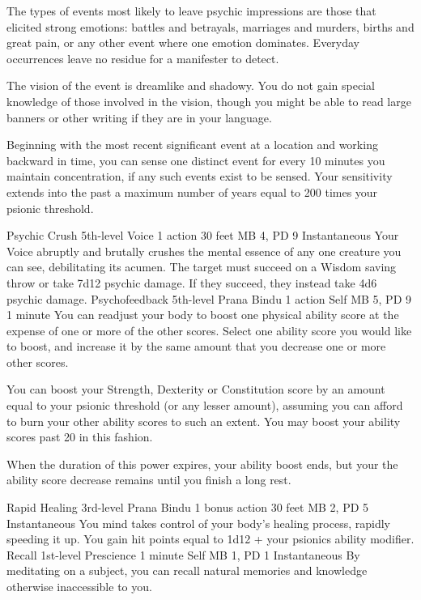 The types of events most likely to leave psychic impressions
are those that elicited strong emotions: battles and betrayals,
marriages and murders, births and great pain, or any other
event where one emotion dominates. Everyday occurrences leave
no residue for a manifester to detect.

The vision of the event is dreamlike and shadowy. You do not
gain special knowledge of those involved in the vision, though
you might be able to read large banners or other writing if
they are in your language.

Beginning with the most recent significant event at a location
and working backward in time, you can sense one distinct event
for every 10 minutes you maintain concentration, if any such
events exist to be sensed. Your sensitivity extends into the
past a maximum number of years equal to 200 times your psionic
threshold.

\DndPowerHeader%
    {Psychic Crush\label{pwr:psychic_crush}}
    {5th-level Voice}
    {1 action}
    {30 feet}
    {MB 4, PD 9}
    {Instantaneous}
Your Voice abruptly and brutally crushes
the mental essence of any one creature you can see, debilitating
its acumen. The target must succeed on a Wisdom saving throw
or take 7d12 psychic damage. If they succeed, they instead
take 4d6 psychic damage.
\DndPowerHeader%
    {Psychofeedback\label{pwr:psychofeedback}}
    {5th-level Prana Bindu}
    {1 action}
    {Self}
    {MB 5, PD 9}
    {1 minute}
You can readjust your body to boost one physical
ability score at the expense of one or more of the other scores.
Select one ability score you would like to boost, and increase
it by the same amount that you decrease one or more other
scores.

You can boost your Strength, Dexterity or Constitution score
by an amount equal to your psionic threshold (or any lesser
amount), assuming you can afford to burn your other ability
scores to such an extent. You may boost your ability scores
past 20 in this fashion.

When the duration of this power expires, your ability boost
ends, but your the ability score decrease remains until you
finish a long rest.

\DndPowerHeader%
    {Rapid Healing\label{pwr:rapid_healing}}
    {3rd-level Prana Bindu}
    {1 bonus action}
    {30 feet}
    {MB 2, PD 5}
    {Instantaneous}
You mind takes control of your body's healing
process, rapidly speeding it up. You gain hit points equal
to 1d12 + your psionics ability modifier.
\DndPowerHeader%
    {Recall\label{pwr:recall}}
    {1st-level Prescience}
    {1 minute}
    {Self}
    {MB 1, PD 1}
    {Instantaneous}
By meditating on a subject, you can recall
natural memories and knowledge otherwise inaccessible to you.


